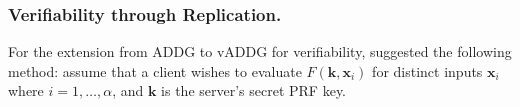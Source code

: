 \documentclass[runningheads]{llncs}
\newcommand{\cc}[1]{\mathcal{#1}} %
\newcommand{\pk}{\textsf{pk}{}}
\newcommand{\eval}{\textsf{Eval}}
\begin{document}

        \subsubsection{Verifiability through Replication.}
        For the extension from ADDG to vADDG for verifiability, \cite{cryptoeprint:PRF} suggested the following method: assume that a client wishes to evaluate \(F(\mathbf{k},\mathbf{x}_i)\) for distinct inputs \(\mathbf{x}_i\) where \(i=1,\dots,\alpha\), and \(\mathbf{k}\) is the server's secret PRF key.
\end{document}
